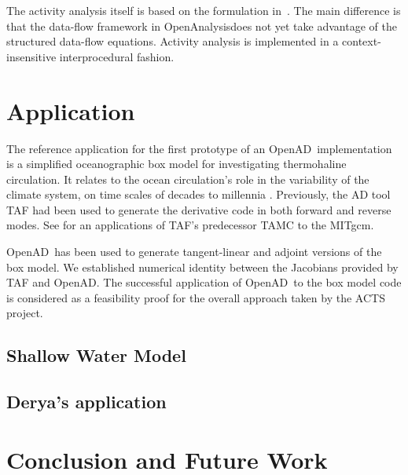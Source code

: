 \documentclass[acmtocl,acmnow]{acmtrans2m}
\newcommand{\OpenAD}{OpenAD}
\newcommand{\OpenAnalysis}{OpenAnalysis}
\begin{document}
The activity analysis itself is based on the formulation in~\cite{UweTBRPaper}.
The main difference is that the data-flow framework in \OpenAnalysis does not
yet take advantage of the structured data-flow equations.  Activity analysis is
implemented in a context-insensitive interprocedural fashion.


\section{Application}

The reference application for the first prototype of an \OpenAD\ implementation
is a simplified oceanographic box model for investigating
thermohaline circulation. It relates to the
ocean circulation's role in the variability of the climate system,
on time scales of decades to millennia \cite{tzi-ioa:02}.
Previously, the AD tool TAF \cite{GiKa02} 
had been used to generate the derivative
code in both forward and reverse modes.
See \cite{maro-eta:99} for an applications of
TAF's predecessor TAMC to the MITgcm.

\OpenAD\ has been used to generate tangent-linear and 
adjoint versions of the box model. We established numerical identity between
the Jacobians provided by TAF and \OpenAD.
The successful 
application of \OpenAD\ to the box model code is considered as a feasibility 
proof for the overall approach taken by the ACTS project.  
\subsection{Shallow Water Model}
\subsection{Derya's application}
\section*{Conclusion and Future Work}
\end{document}
